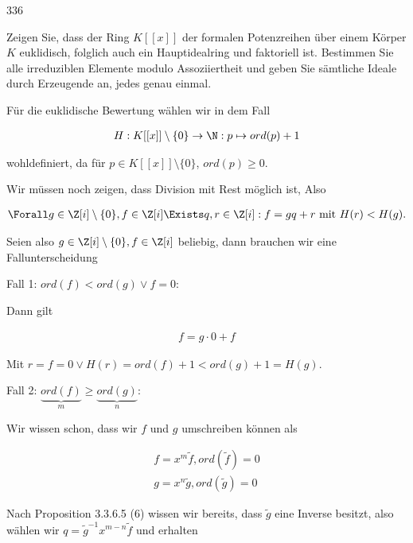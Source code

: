 \begin{algebraUE}{336}

Zeigen Sie, dass der Ring $K[[x]]$ der formalen Potenzreihen über einem Körper $K$ euklidisch, folglich auch ein Hauptidealring und faktoriell ist. Bestimmen Sie alle irreduziblen Elemente modulo Assoziiertheit und geben Sie sämtliche Ideale durch Erzeugende an, jedes genau einmal.

\end{algebraUE}

\begin{solution}

Für die euklidische Bewertung wählen wir in dem Fall

\begin{align*}
  H:K[[x]] \setminus \{0\} \to \N: p \mapsto ord(p)+1
\end{align*}

wohldefiniert, da für $p \in K[[x]] \setminus \{0\}$, $ord(p) \geq 0$.

Wir müssen noch zeigen, dass Division mit Rest möglich ist, Also

\begin{align*}
  \Forall g \in \Z [i] \setminus \{0\}, f \in \Z [i] \Exists q,r \in \Z [i]: f = gq + r \text{~mit~} H(r) < H(g).
\end{align*}

Seien also $g \in \Z [i] \setminus \{0\}, f \in \Z [i]$ beliebig, dann brauchen wir eine Fallunterscheidung

Fall 1: $ord(f) < ord(g) \lor f = 0$:

Dann gilt

\begin{align*}
  f = g \cdot 0 + f
\end{align*}

Mit $r = f = 0 \lor H(r) = ord(f) + 1 < ord(g) + 1 = H(g)$.

Fall 2: $\underbrace{ord(f)}_{m} \geq \underbrace{ord(g)}_{n}$:

Wir wissen schon, dass wir $f$ und $g$ umschreiben können als

\begin{align*}
  f = x^m\tilde{f}, ord(\tilde{f}) = 0 \\
  g = x^n\tilde{g}, ord(\tilde{g}) = 0
\end{align*}

Nach Proposition 3.3.6.5 (6) wissen wir bereits, dass $\tilde{g}$ eine Inverse besitzt, also wählen wir $q = \tilde{g}^{-1}x^{m-n}\tilde{f}$ und erhalten


\end{solution}
